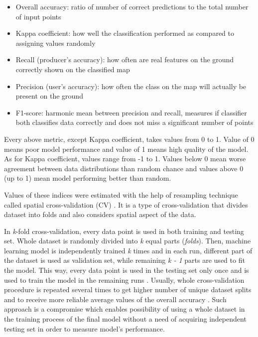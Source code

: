 \documentclass{amuthesis}
\begin{document}
\begin{itemize}
\item
  Overall accuracy: ratio of number of correct predictions to the total
  number of input points
\item
  Kappa coefficient: how well the classification performed as compared
  to assigning values randomly
\item
  Recall (producer's accuracy): how often are real features on the
  ground correctly shown on the classified map
\item
  Precision (user's accuracy): how often the class on the map will
  actually be present on the ground
\item
  F1-score: harmonic mean between precision and recall, measures if
  classifier both classifies data correctly and does not miss a
  significant number of points
\end{itemize}

Every above metric, except Kappa coefficient, takes values from 0 to 1.
Value of 0 means poor model performance and value of 1 means high
quality of the model. As for Kappa coefficient, values range from -1 to
1. Values below 0 mean worse agreement between data distributions than
random chance and values above 0 (up to 1) mean model performing better
than random.

Values of these indices were estimated with the help of resampling
technique called spatial cross-validation (CV)
\autocite{lovelace_geocomputation_2019}. It is a type of
cross-validation that divides dataset into folds and also considers
spatial aspect of the data.

In \emph{k}-fold cross-validation, every data point is used in both
training and testing set. Whole dataset is randomly divided into
\emph{k} equal parts (\emph{folds}). Then, machine learning model is
independently trained \emph{k} times and in each run, different part of
the dataset is used as validation set, while remaining \emph{k - 1}
parts are used to fit the model. This way, every data point is used in
the testing set only once and is used to train the model in the
remaining runs \autocite{jiao_performance_2016}. Usually, whole
cross-validation procedure is repeated several times to get higher
number of unique dataset splits and to receive more reliable average
values of the overall accuracy \autocite{varga_validation_2021}. Such
approach is a compromise which enables possibility of using a whole
dataset in the training process of the final model without a need of
acquiring independent testing set in order to measure model's
performance.
\end{document}
